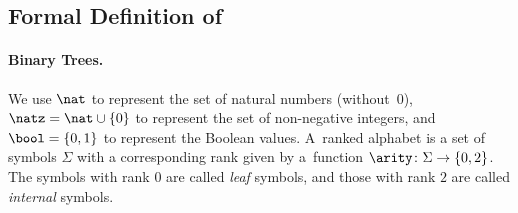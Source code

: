 \vspace{-0.0mm}
\subsection{Formal Definition of \lstas}
\label{sec:lstabasics}
\vspace{-0.0mm}

\paragraph{Binary Trees.} 
We use $\nat$ to represent the set of natural numbers
(without~0), $\natz=\nat\cup\{0\}$ to represent the set of non-negative integers, and $\bool = \{0,1\}$ to represent the Boolean values.
A~ranked alphabet is a set of symbols $\Sigma$ with a corresponding rank given by a~function $\arity\colon\Sigma\to\{0,2\}$. The symbols with rank $0$ are called 
\emph{leaf} symbols, and those with rank $2$ are called \emph{internal} symbols.



